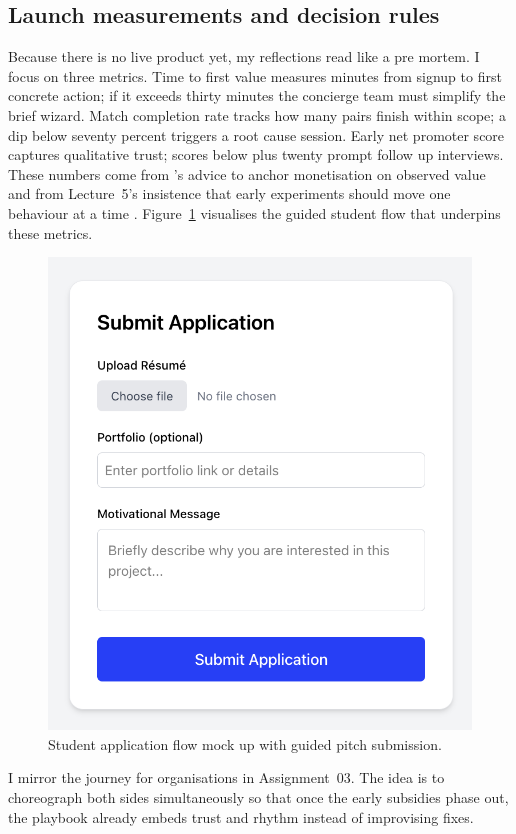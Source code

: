 \subsection*{Launch measurements and decision rules}
Because there is no live product yet, my reflections read like a pre mortem. I focus on three metrics. Time to first value measures minutes from signup to first concrete action; if it exceeds thirty minutes the concierge team must simplify the brief wizard. Match completion rate tracks how many pairs finish within scope; a dip below seventy percent triggers a root cause session. Early net promoter score captures qualitative trust; scores below plus twenty prompt follow up interviews. These numbers come from \citet{ShapiroVarian1999}'s advice to anchor monetisation on observed value and from Lecture~5's insistence that early experiments should move one behaviour at a time \citep{Lecture05}. Figure~\ref{fig:application-flow} visualises the guided student flow that underpins these metrics.

\begin{figure}[H]
  \centering
  \includegraphics[width=0.85\linewidth]{figures/Student-Submission.png}
  \caption{Student application flow mock up with guided pitch submission.}
  \label{fig:application-flow}
\end{figure}

I mirror the journey for organisations in Assignment~03. The idea is to choreograph both sides simultaneously so that once the early subsidies phase out, the playbook already embeds trust and rhythm instead of improvising fixes.
